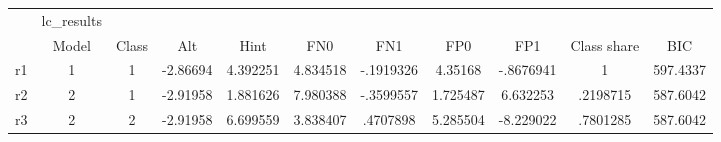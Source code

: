 \begin{tabular}{l*{10}{c}}
\hline\hline
            &  lc\_results&            &            &            &            &            &            &            &            &            \\
            &       Model&       Class&         Alt&        Hint&         FN0&         FN1&         FP0&         FP1& Class share&         BIC\\
\hline
r1          &           1&           1&    -2.86694&    4.392251&    4.834518&   -.1919326&     4.35168&   -.8676941&           1&    597.4337\\
r2          &           2&           1&    -2.91958&    1.881626&    7.980388&   -.3599557&    1.725487&    6.632253&    .2198715&    587.6042\\
r3          &           2&           2&    -2.91958&    6.699559&    3.838407&    .4707898&    5.285504&   -8.229022&    .7801285&    587.6042\\
\hline\hline
\end{tabular}
